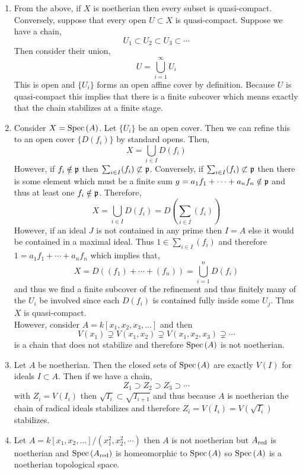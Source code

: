 \documentclass[12pt]{article}
\begin{document}
\begin{enumerate}
\item From the above, if $X$ is noetherian then every subset is quasi-compact. Conversely, suppose that every open $U \subset X$ is quasi-compact. Suppose we have a chain,
\[ U_1 \subset U_2 \subset U_3 \subset \cdots \]
Then consider their union,
\[ U = \bigcup_{i = 1}^\infty U_i \]
This is open and $\{ U_i \}$ forms an open affine cover by definition. Because $U$ is quasi-compact this implies that there is a finite subcover which means exactly that the chain stabilizes at a finite stage.

\item Consider $X = \mathrm{Spec}\left( A \right)$. Let $\{ U_i \}$ be an open cover. Then we can refine this to an open cover $\{ D(f_i) \}$ by standard opens. Then, 
\[ X = \bigcup_{i \in I} D(f_i) \]
However, if $f_i \notin \mathfrak{p}$ then $\sum_{i \in I} (f_i) \not\subset \mathfrak{p}$. Conversely, if $\sum_{i \in I} (f_i) \not\subset \mathfrak{p}$ then there is some element which must be a finite sum $g = a_1 f_1 + \cdots + a_n f_n \notin \mathfrak{p}$ and thus at least one $f_i \notin \mathfrak{p}$. Therefore,
\[ X = \bigcup_{i \in I} D(f_i) = D \left( \sum_{i \in I} (f_i) \right) \]
However, if an ideal $J$ is not contained in any prime then $I = A$ else it would be contained in a maximal ideal. Thus $1 \in \sum_{i \in I} (f_i)$ and therefore $1 = a_1 f_1 + \cdots + a_n f_n$ which implies that,
\[ X = D((f_1) + \cdots + (f_n)) = \bigcup_{i = 1}^n D(f_i) \]
and thus we find a finite subcover of the refinement and thus finitely many of the $U_i$ be involved since each $D(f_i)$ is contained fully inside some $U_j$. Thus $X$ is quasi-compact. 
\bigskip\\
However, consider $A = k[x_1, x_2, x_3, \dots]$ and then
\[ V(x_1) \supsetneq V(x_1, x_2) \supsetneq V(x_1, x_2, x_3) \supsetneq \cdots \]
is a chain that does not stabilize and therefore $\mathrm{Spec}\left( A \right)$ is not noetherian.

\item Let $A$ be noetherian. Then the closed sets of $\mathrm{Spec}\left( A \right)$ are exactly $V(I)$ for ideals $I \subset A$. Then if we have a chain,
\[ Z_1 \supset Z_2 \supset Z_3 \supset \cdots \]
with $Z_i = V(I_i)$ then $\sqrt{I_i} \subset \sqrt{I_{i+1}}$ and thus because $A$ is noetherian the chain of radical ideals stabilizes and therefore $Z_i = V(I_i) = V(\sqrt{I_i})$ stabilizes.

\item Let $A = k[x_1, x_2, \dots]/(x_1^2, x_2^2, \cdots)$ then $A$ is not noetherian but $A_{\mathrm{red}}$ is noetherian and $\mathrm{Spec}\left( A_{\mathrm{red}} \right)$ is homeomorphic to $\mathrm{Spec}\left( A \right)$ so $\mathrm{Spec}\left( A \right)$ is a noetherian topological space.
\end{enumerate}
\end{document}

